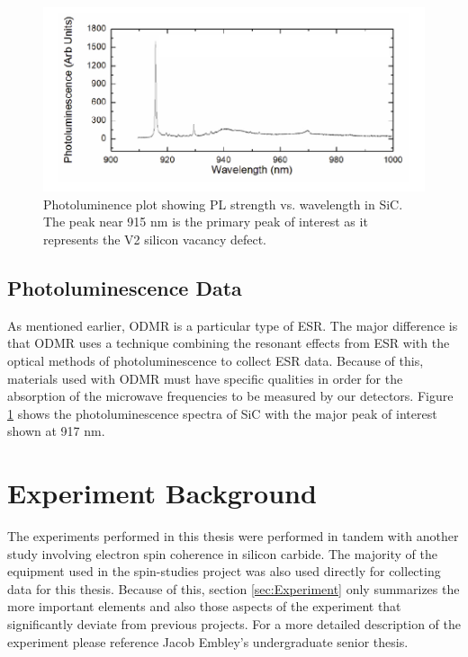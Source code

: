 \documentclass[oneside]{BYUPhys}
\begin{document}
\begin{figure}
    \centerline{\includegraphics{sic_pl_fig}}
    \caption[Photoluminence Spectra of Silicon Carbide]{\label{fig:SiCPL}
      Photoluminence plot showing PL strength vs. wavelength in SiC. The peak near 915 nm is the primary peak of interest as it represents the V2 silicon vacancy defect.}
 \end{figure}

\subsection{Photoluminescence Data}

As mentioned earlier, ODMR is a particular type of ESR. The major difference is that ODMR uses a technique combining the resonant effects from ESR with the optical methods of photoluminescence to collect ESR data. Because of this, materials used with ODMR must have specific qualities in order for the absorption of the microwave frequencies to be measured by our detectors. Figure \ref{fig:SiCPL} shows the photoluminescence spectra of SiC with the major peak of interest shown at 917 nm.

\section{Experiment Background}

The experiments performed in this thesis were performed in tandem with another study involving electron spin coherence in silicon carbide. The majority of the equipment used in the spin-studies project was also used directly for collecting data for this thesis. Because of this, section \ref{sec:Experiment} only summarizes the more important elements and also those aspects of the experiment that significantly deviate from previous projects. For a more detailed description of the experiment please reference Jacob Embley's undergraduate senior thesis. \cite{RefWorks:doc:5892912ae4b0dec22aee3993}
\end{document}
